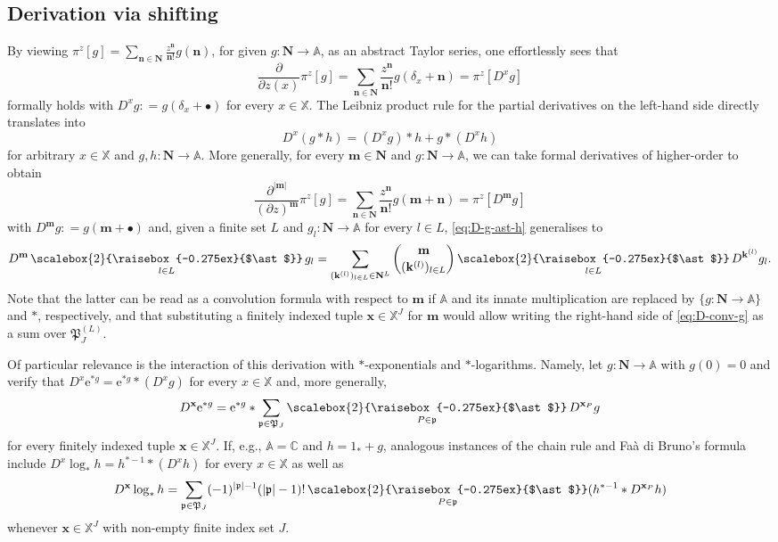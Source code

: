 \documentclass[reqno, 11pt]{amsart}
\theoremstyle{definition}
\newcommand{\e}{\mathrm{e}}
\newcommand{\C}{\mathbb{C}}
\newcommand{\X}{\mathbb X}
\newcommand{\A}{\mathbb A}
\newcommand{\be}{\begin{equation}}
\newcommand{\ee}{\end{equation}}
\newcommand{\Conv}{\mathop{\scalebox{2}{\raisebox{-0.275ex}{$\ast$}}}}
\begin{document}
\subsection{Derivation via shifting}

By viewing $\pi^z[g] = \sum_{\mathbf n \in \mathbf N} \frac{z^\mathbf n}{\mathbf n!} g(\mathbf n)$, for given $g : \mathbf N \to \A$, as an abstract Taylor series, one effortlessly sees that
\[
	\frac{\partial}{\partial z(x)} \pi^z[g] = \sum_{\mathbf n \in \mathbf N} \frac{z^\mathbf n}{\mathbf n!} g(\delta_x + \mathbf n) = \pi^z[D^x g]
\]
formally holds with $D^x g : = g(\delta_x + \bullet)$ for every $x \in \X$. 
The Leibniz product rule for the partial derivatives on the left-hand side directly translates into
\be \label{eq:D-g-ast-h}
	D^x (g \ast h) = (D^x g) \ast h + g \ast (D^x h)
\ee
for arbitrary $x \in \X$ and $g, h : \mathbf N \to \A$. 
More generally, for every $\mathbf m \in \mathbf N$ and $g : \mathbf N \to \A$, we can take formal derivatives of higher-order to obtain
\[
	\frac{\partial^{|\mathbf m|}}{(\partial z)^\mathbf m} \pi^z[g] = \sum_{\mathbf n \in \mathbf N} \frac{z^\mathbf n}{\mathbf n!} g(\mathbf m + \mathbf n) = \pi^z[D^\mathbf m g]
\]
with $D^\mathbf m g : = g(\mathbf m + \bullet)$ and, given a finite set $L$ and $g_l : \mathbf N \to \A$ for every $l \in L$, \eqref{eq:D-g-ast-h} generalises to
\be \label{eq:D-conv-g}
	D^\mathbf m \Conv_{l \in L} g_l = \sum_{(\mathbf k^{(l)})_{l \in L} \in \mathbf N^L} \binom{\mathbf m}{(\mathbf k^{(l)})_{l \in L}} \Conv_{l \in L} D^{\mathbf k^{(l)}} g_l.
\ee
Note that the latter can be read as a convolution formula with respect to $\mathbf m$ if $\A$ and its innate multiplication are replaced by $\{g : \mathbf N \to \A\}$ and $\ast$, respectively, and that substituting a finitely indexed tuple $\mathbf x \in \X^J$ for $\mathbf m$ would allow writing the right-hand side of \eqref{eq:D-conv-g} as a sum over $\mathfrak P_J^{(L)}$.

Of particular relevance is the interaction of this derivation with $\ast$-exponentials and $\ast$-logarithms. 
Namely, let $g : \mathbf N \to \A$ with $g(0) = 0$ and verify that $D^x \e^{\ast g} = \e^{\ast g} \ast (D^x g)$ for every $x \in \X$ and, more generally,
\be \label{eq:D-exp}
	D^\mathbf x \e^{\ast g} = \e^{\ast g} \ast \sum_{\mathfrak p \in \mathfrak P_J} \Conv_{P \in \mathfrak p} D^{\mathbf x_P} g
\ee
for every finitely indexed tuple $\mathbf x \in \X^J$. 
If, e.g., $\A = \C$ and $h = 1_\ast + g$, analogous instances of the chain rule and Fa\`a di Bruno's formula include $D^x \log_\ast h = h^{\ast -1} \ast (D^x h)$ for every $x \in \X$ as well as
\begin{equation} \label{eq:D-log}
	D^\mathbf x \log_\ast h = \sum_{\mathfrak p \in \mathfrak P_J} (-1)^{|\mathfrak p| - 1} (|\mathfrak p| - 1)! \Conv_{P \in \mathfrak p} (h^{\ast -1} \ast D^{\mathbf x_P} h)
\end{equation}
whenever $\mathbf x \in \X^J$ with non-empty finite index set $J$.
\end{document}
